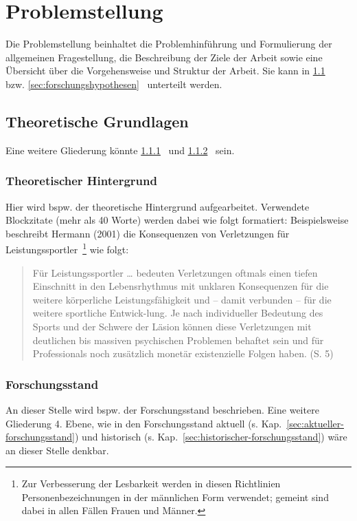 \chapter{Problemstellung}
Die Problemstellung beinhaltet die Problemhinführung und Formulierung der allgemeinen Fragestellung, die Beschreibung der Ziele der Arbeit sowie eine Übersicht über die Vorgehensweise und Struktur der Arbeit. Sie kann in \ref{sec:theoretische-grundlagen}~ bzw. \ref{sec:forschungshypothesen}~ unterteilt werden.
\section{Theoretische Grundlagen}\label{sec:theoretische-grundlagen}
Eine weitere Gliederung könnte \ref{sec:theoretischer-hintergrund}~ und \ref{sec:forschungsstand}~ sein.
\subsection{Theoretischer Hintergrund}\label{sec:theoretischer-hintergrund}
Hier wird bspw. der theoretische Hintergrund aufgearbeitet. Verwendete Blockzitate (mehr als 40 Worte) werden dabei wie folgt formatiert:
Beispielsweise beschreibt Hermann (2001) die Konsequenzen von Verletzungen für Leistungssportler~\footnote{Zur Verbesserung der Lesbarkeit werden in diesen Richtlinien Personenbezeichnungen in der männlichen Form verwendet; gemeint sind dabei in allen Fällen Frauen und Männer.} wie folgt:
\begin{quotation}
	Für Leistungssportler … bedeuten Verletzungen oftmals einen tiefen Einschnitt in den Lebensrhythmus mit unklaren Konsequenzen für die weitere körperliche Leistungsfähigkeit und – damit verbunden – für die weitere sportliche Entwick-lung. Je nach individueller Bedeutung des Sports und der Schwere der Läsion können diese Verletzungen mit deutlichen bis massiven psychischen Problemen behaftet sein und für Professionals noch zusätzlich monetär existenzielle Folgen haben. (S. 5)
\end{quotation}


\subsection{Forschungsstand}\label{sec:forschungsstand}
An dieser Stelle wird bspw. der Forschungsstand beschrieben. Eine weitere Gliederung 4. Ebene, wie in den Forschungsstand aktuell (s. Kap.~\ref{sec:aktueller-forschungsstand}) und historisch (s. Kap.~\ref{sec:historischer-forschungsstand}) wäre an dieser Stelle denkbar.
